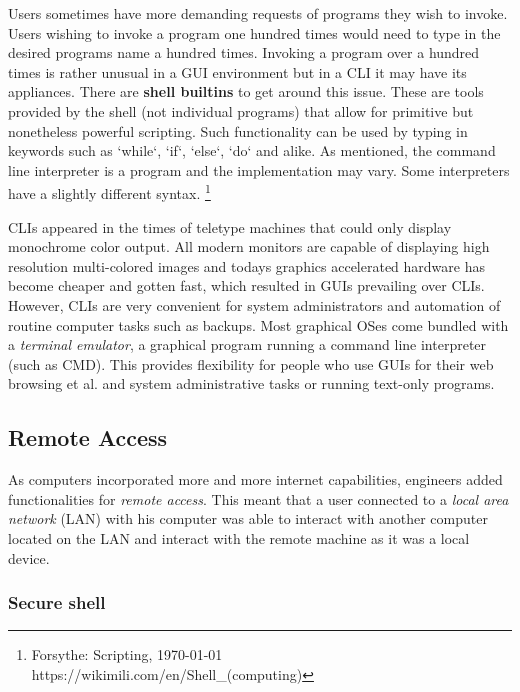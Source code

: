 Users sometimes have more demanding requests of programs they wish to invoke. Users wishing to invoke a
program one hundred times would need to type in the desired programs name a hundred times. Invoking
a program over a hundred times is rather unusual in a GUI environment but in a CLI it may have its
appliances. There are \textbf{shell builtins} to get around this issue. These are tools provided by the shell
(not individual programs) that allow for primitive but nonetheless powerful scripting. Such functionality
can be used by typing in keywords such as `while`, `if`, `else`, `do` and alike. As mentioned,
the command line interpreter is a program and the implementation may vary. Some interpreters have a
slightly different syntax. \footnote{Forsythe: Scripting, \today \\ https://wikimili.com/en/Shell\_(computing)}



CLIs appeared in the times of teletype machines that could only display monochrome color output. All
modern monitors are capable of displaying high resolution multi-colored images and todays graphics
accelerated hardware has become cheaper and gotten fast, which resulted in GUIs prevailing over
CLIs. However, CLIs are very convenient for system administrators and automation of routine computer
tasks such as backups. Most graphical OSes come bundled with a \textit{terminal emulator}, a graphical program
running a command line interpreter (such as CMD). This provides flexibility for people who use GUIs for their web
browsing et al. and system administrative tasks or running text-only programs.


\subsection{Remote Access}

As computers incorporated more and more internet capabilities, engineers added functionalities for
\textit{remote access}. This meant that a user connected to a \textit{local area network} (LAN) with his computer
was able to interact with another computer located on the LAN and interact with the remote machine
as it was a local device. 

\subsubsection{Secure shell}

